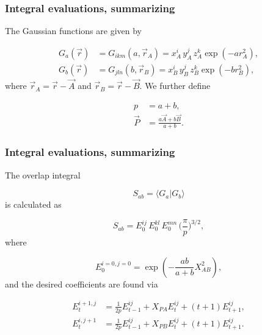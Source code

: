 \documentclass{beamer}
\begin{document}
\begin{frame}
\frametitle{Integral evaluations, summarizing}

\begin{block}{}

The Gaussian functions are given by

\begin{equation}
 \begin{split}
  G_a(\vec r) & = G_{ikm}(a, \vec r_A) = x^i_A\,y^j_A\,z^k_A\exp(-a r^2_A), \\
  G_b(\vec r) & = G_{jln}(b, \vec r_B) = x^i_B\,y^j_B\,z^k_B\exp(-b r^2_B),
 \end{split}
\end{equation}
where $\vec r_A = \vec r - \vec A$ and $\vec r_B = \vec r - \vec B$. We further define

\begin{equation}
\begin{split}
  p & = a + b, \\
 \vec P & = \frac{a\vec A + b\vec B}{a + b}.
\end{split}
\end{equation}
\end{block}
\end{frame}

\begin{frame}
\frametitle{Integral evaluations, summarizing}

\begin{block}{}

The overlap integral

\begin{equation}
 S_{ab} = \langle G_a|G_b\rangle
\end{equation}
is calculated as

\begin{equation}
 S_{ab} = E^{ij}_0\,E^{kl}_0\,E^{mn}_0\,\Big(\frac{\pi}{p}\Big)^{3/2},
\end{equation}
where

\begin{equation}
 E^{i=0,j=0}_0 = \exp(-\frac{ab}{a+b}X_{AB}^2),
\end{equation}
and the desired coefficients are found via

\begin{equation}
\begin{split}
 E^{i+1,j}_t & = \frac{1}{2p}E^{ij}_{t-1} + X_{PA}E^{ij}_t + (t+1)E^{ij}_{t+1}, \\
 E^{i,j+1}_t & = \frac{1}{2p}E^{ij}_{t-1} + X_{PB}E^{ij}_t + (t+1)E^{ij}_{t+1}.
\end{split}
\end{equation}
\end{block}
\end{frame}
\end{document}
